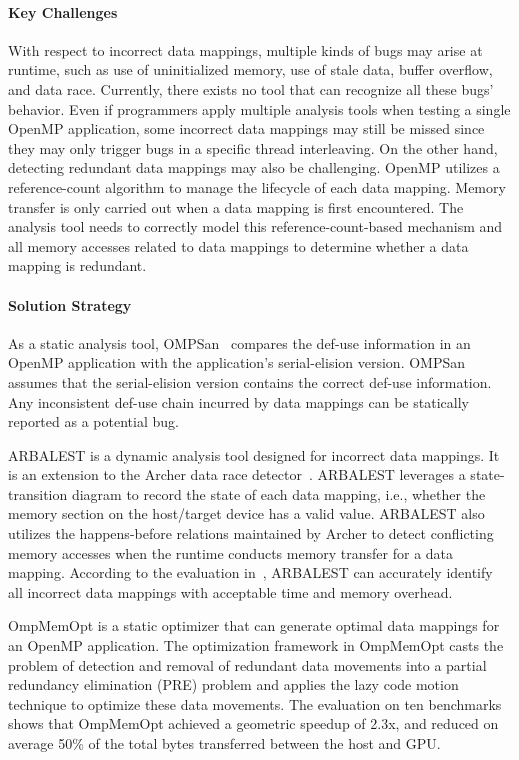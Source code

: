 \paragraph{Key Challenges}
With respect to incorrect data mappings, multiple kinds of bugs may arise at runtime, such as use of uninitialized memory, use of stale data, buffer overflow, and data race. Currently, there exists no tool that can recognize all these bugs' behavior. 
Even if programmers apply multiple analysis tools when testing a single OpenMP application, some incorrect data mappings may still be missed since they may only trigger bugs in a specific thread interleaving.
On the other hand, detecting redundant data mappings may also be challenging. OpenMP utilizes a reference-count algorithm to manage the lifecycle of each data mapping. Memory transfer is only carried out when a data mapping is first encountered.
The analysis tool needs to correctly model this reference-count-based mechanism and all memory accesses related to data mappings to determine whether a data mapping is redundant.

\paragraph{Solution Strategy}
As a static analysis tool, OMPSan~\cite{barua2019ompsan} compares the def-use information in an OpenMP application with the application's serial-elision version. OMPSan assumes that the serial-elision version contains the correct def-use information. Any inconsistent def-use chain incurred by data mappings can be statically reported as a potential bug.

ARBALEST is a dynamic analysis tool designed for incorrect data mappings. It is an extension to the Archer data race detector~\cite{atzeni2016archer}. ARBALEST leverages a state-transition diagram to record the state of each data mapping, i.e., whether the memory section on the host/target device has a valid value. ARBALEST also utilizes the happens-before relations maintained by Archer to detect conflicting memory accesses when the runtime conducts memory transfer for a data mapping.
According to the evaluation in~\cite{yu2021arbalest}, ARBALEST can accurately identify all incorrect data mappings with acceptable time and memory overhead.

OmpMemOpt\cite{barua2020ompmemopt} is a static optimizer that can generate optimal data mappings for an OpenMP application. 
The optimization framework in OmpMemOpt casts the problem of detection and removal of redundant data movements into a partial redundancy elimination (PRE) problem and applies
the lazy code motion technique to optimize these data movements.
The evaluation on ten benchmarks shows that OmpMemOpt achieved a geometric speedup of 2.3x, and reduced on average 50\% of the total bytes transferred between the host and GPU.

